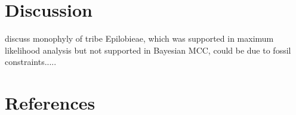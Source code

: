 \documentclass[review]{elsarticle}
\begin{document}

\section{Discussion}

discuss monophyly of tribe Epilobieae, which was supported in 
maximum likelihood analysis but not supported in Bayesian MCC, could be due to
fossil constraints.....


\section*{References}


\end{document}
